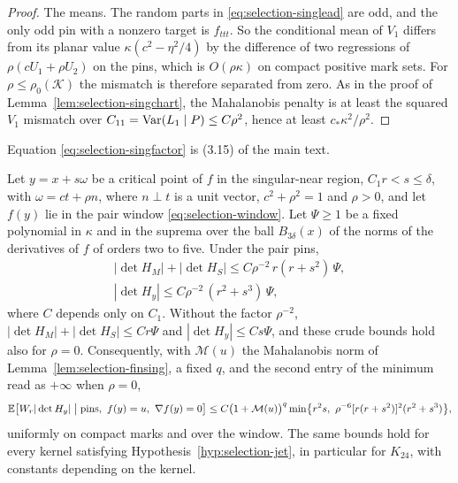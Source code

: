 \begin{proof}
The means. The random parts in \eqref{eq:selection-singlead} are odd, and the only odd pin with a nonzero target is $f_{ttt}$. So the conditional mean of $V_1$ differs from its planar value $\kappa(c^2-\eta^2/4)$ by the difference of two regressions of $\rho(cU_1+\rho U_2)$ on the pins, which is $O(\rho\kappa)$ on compact positive mark sets. For $\rho\le\rho_0(\mathcal K)$ the mismatch is therefore separated from zero. As in the proof of Lemma~\ref{lem:selection-singchart}, the Mahalanobis penalty is at least the squared $V_1$ mismatch over $C_{11}=\operatorname{Var}(L_1\mid P)\le C\rho^2$, hence at least $c_*\kappa^2/\rho^2$.
\end{proof}

Equation \eqref{eq:selection-singfactor} is (3.15) of the main text.

\begin{lemma}\label{lem:selection-envelope}
Let $y=x+s\omega$ be a critical point of $f$ in the singular-near region, $C_1r<s\le\delta$, with $\omega=ct+\rho n$, where $n\perp t$ is a unit vector, $c^2+\rho^2=1$ and $\rho>0$, and let $f(y)$ lie in the pair window \eqref{eq:selection-window}. Let $\Psi\ge1$ be a fixed polynomial in $\kappa$ and in the suprema over the ball $B_{3\delta}(x)$ of the norms of the derivatives of $f$ of orders two to five. Under the pair pins,
\begin{gather}
|\det H_M|+|\det H_S|\le C\rho^{-2}\,r(r+s^2)\,\Psi,\label{eq:selection-endenv}\\
|\det H_y|\le C\rho^{-2}\,(r^2+s^3)\,\Psi,\label{eq:selection-thirdenv}
\end{gather}
where $C$ depends only on $C_1$. Without the factor $\rho^{-2}$, $|\det H_M|+|\det H_S|\le Cr\Psi$ and $|\det H_y|\le Cs\Psi$, and these crude bounds hold also for $\rho=0$. Consequently, with $\mathcal M(u)$ the Mahalanobis norm of Lemma~\ref{lem:selection-finsing}, a fixed $q$, and the second entry of the minimum read as $+\infty$ when $\rho=0$,
\begin{equation}\label{eq:selection-envelope}
\E\bigl[W_r|\det H_y|\bigm|\text{pins},\ f(y)=u,\ \nabla f(y)=0\bigr]\le C\bigl(1+\mathcal M(u)\bigr)^q\min\bigl\{r^2s,\ \rho^{-6}[r(r+s^2)]^2(r^2+s^3)\bigr\},
\end{equation}
uniformly on compact marks and over the window. The same bounds hold for every kernel satisfying Hypothesis~\ref{hyp:selection-jet}, in particular for $K_{24}$, with constants depending on the kernel.
\end{lemma}

